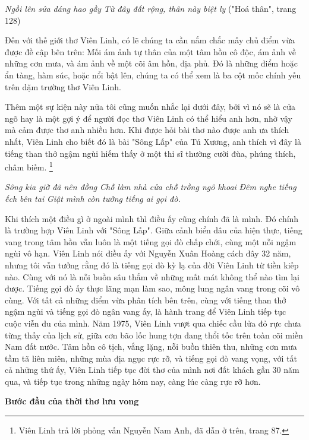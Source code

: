\documentclass[../main.tex]{subfiles}
\begin{document}
\begin{multicols}{2}
\textit{Ngồi lên sửa dáng hao gầy} 
\textit{Từ đây đất rộng, thân này biệt ly} 
("Hoá thân", trang 128) 
 
Đến với thế giới thơ Viên Linh, có lẽ chúng ta cần nắm chắc mấy chủ điểm vừa được đề cập bên trên: Mối ám ảnh tự thân của một tâm hồn cô độc, ám ảnh về những cơn mưa, và ám ảnh về một cõi âm hồn, địa phủ. Đó là những điểm hoặc ẩn tàng, hàm súc, hoặc nổi bật lên, chúng ta có thể xem là ba cột mốc chính yếu trên dặm trường thơ Viên Linh. 
 
Thêm một sự kiện này nữa tôi cũng muốn nhắc lại dưới đây, bởi vì nó sẽ là cửa ngõ hay là một gợi ý để người đọc thơ Viên Linh có thể hiểu anh hơn, nhờ vậy mà cảm được thơ anh nhiều hơn. Khi được hỏi bài thơ nào được anh ưa thích nhất, Viên Linh cho biết đó là bài "Sông Lấp" của Tú Xương, anh thích vì đây là tiếng than thở ngậm ngùi hiếm thấy ở một thi sĩ thường cười đùa, phúng thích, châm biếm. \footnote{
Viên Linh trả lời phỏng vấn Nguyễn Nam Anh, đã dẫn ở trên, trang 87.}  
 
\textit{Sông kia giờ đã nên đồng} 
\textit{Chỗ làm nhà cửa chỗ trồng ngô khoai} 
\textit{Đêm nghe tiếng ếch bên tai} 
\textit{Giật mình còn tưởng tiếng ai gọi đò.} 
 
Khi thích một điều gì ở ngoài mình thì điều ấy cũng chính đã là mình. Đó chính là trường hợp Viên Linh với "Sông Lấp". Giữa cảnh biển dâu của hiện thực, tiếng vang trong tâm hồn vẫn luôn là một tiếng gọi đò chấp chới, cùng một nỗi ngậm ngùi vô hạn. Viên Linh nói điều ấy với Nguyễn Xuân Hoàng cách đây 32 năm, nhưng tôi vẫn tưởng rằng đó là tiếng gọi đò kỳ lạ của đời Viên Linh từ tiền kiếp nào. Cùng với nó là nỗi buồn sâu thẳm về những mất mát không thể nào tìm lại được. Tiếng gọi đò ấy thực lãng mạn làm sao, mông lung ngân vang trong cõi vô cùng. Với tất cả những điểm vừa phân tích bên trên, cùng với tiếng than thở ngậm ngùi và tiếng gọi đò ngân vang ấy, là hành trang để Viên Linh tiếp tục cuộc viễn du của mình. Năm 1975, Viên Linh vượt qua chiếc cầu lửa đỏ rực chưa từng thấy của lịch sử, giữa cơn bão lốc hung tợn đang thổi tốc trên toàn cõi miền Nam đất nước. Tâm hồn cô tịch, vắng lặng, nỗi buồn thiên thu, những cơn mưa tầm tã liên miên, những mùa địa ngục rực rỡ, và tiếng gọi đò vang vọng, với tất cả những thứ ấy, Viên Linh tiếp tục đời thơ của mình nơi đất khách gần 30 năm qua, và tiếp tục trong những ngày hôm nay, càng lúc càng rực rỡ hơn. 
 
 
\textbf{Bước đầu của thời thơ lưu vong } 
 

\end{multicols}
\end{document}
